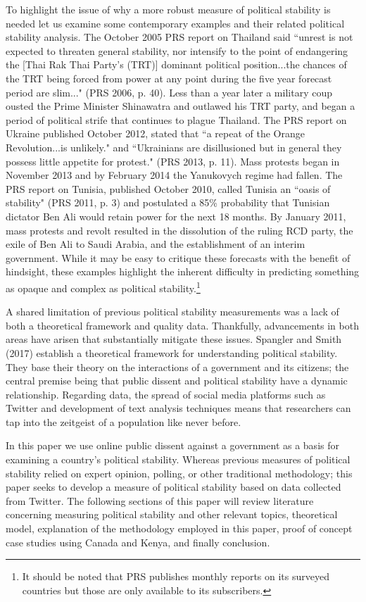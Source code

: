 \documentclass[12pt]{article}
\begin{document}
\begin{spacing}{1.5}
To highlight the issue of why a more robust measure of political stability is needed let us examine some contemporary examples and their related political stability analysis. The October 2005 PRS report on Thailand said ``unrest is not expected to threaten general stability, nor intensify to the point of endangering the [Thai Rak Thai Party's (TRT)] dominant political position...the chances of the TRT being forced from power at any point during the five year forecast period are slim..." (PRS 2006, p. 40). Less than a year later a military coup ousted the Prime Minister Shinawatra and outlawed his TRT party, and began a period of political strife that continues to plague Thailand. The PRS report on Ukraine published October 2012, stated that ``a repeat of the Orange Revolution...is unlikely." and ``Ukrainians are disillusioned but in general they possess little appetite for protest." (PRS 2013, p. 11). Mass protests began in November 2013 and by February 2014 the Yanukovych regime had fallen. The PRS report on Tunisia, published October 2010, called Tunisia an ``oasis of stability" (PRS 2011, p. 3) and postulated a 85\% probability that Tunisian dictator Ben Ali would retain power for the next 18 months. By January 2011, mass protests and revolt resulted in the dissolution of the ruling RCD party, the exile of Ben Ali to Saudi Arabia, and the establishment of an interim government. While it may be easy to critique these forecasts with the benefit of hindsight, these examples highlight the inherent difficulty in predicting something as opaque and complex as political stability.\footnote{It should be noted that PRS publishes monthly reports on its surveyed countries but those are only available to its subscribers.} 

A shared limitation of previous political stability measurements was a lack of both a theoretical framework and quality data. Thankfully, advancements in both areas have arisen that substantially mitigate these issues. Spangler and Smith (2017) establish a theoretical framework for understanding political stability. They base their theory on the interactions of a government and its citizens; the central premise being that public dissent and political stability have a dynamic relationship. Regarding data, the spread of social media platforms such as Twitter and development of text analysis techniques means that researchers can tap into the zeitgeist of a population like never before. 

In this paper we use online public dissent against a government as a basis for examining a country's political stability. Whereas previous measures of political stability relied on expert opinion, polling, or other traditional methodology; this paper seeks to develop a measure of political stability based on data collected from Twitter. The following sections of this paper will review literature concerning measuring political stability and other relevant topics, theoretical model, explanation of the methodology employed in this paper, proof of concept case studies using Canada and Kenya, and finally conclusion. 


\end{spacing}
\end{document}
